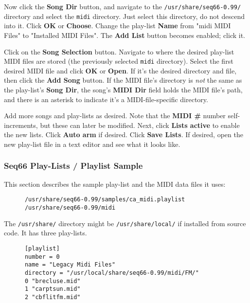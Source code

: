    Now click the \textbf{Song Dir} button,
   and navigate to the
   \texttt{/usr/share/seq66-0.99/} directory and select the
   \texttt{midi} directory.
   Just select this directory, do not descend into it.
   Click \textbf{OK} or \textbf{Choose}.
   Change the play-list \textbf{Name} from
   "midi MIDI Files" to "Installed MIDI Files".
   The \textbf{Add List} button becomes enabled; click it.
   
   Click on the \textbf{Song Selection} button.
   Navigate to where the desired play-list MIDI files are stored
   (the previously selected \texttt{midi} directory).
   Select the first desired MIDI file and click \textbf{OK} or
   \textbf{Open}.
   If it's the desired directory and file,
   then click the \textbf{Add Song} button.
   If the MIDI file's directory is \textsl{not} the same as the play-list's
   \textbf{Song Dir},
   the song's \textbf{MIDI Dir} field holds the MIDI file's
   path, and there is an asterisk to indicate it's a
   MIDI-file-specific directory.

   Add more songs and play-lists as desired.
   Note that the \textbf{MIDI \#} number self-increments, but
   these can later be modified.
   Next, click
   \textbf{Lists active} to enable the new lists.
   Click \textbf{Auto arm} if desired.
   Click \textbf{Save Lists}.
   If desired, open the new play-list file in a text editor
   and see what it looks like.


\subsubsection{Seq66 Play-Lists / Playlist Sample}
\label{subsubsec:playlist_playlist_sample}

   This section describes the sample play-list and the MIDI data
   files it uses:

   \begin{verbatim}
      /usr/share/seq66-0.99/samples/ca_midi.playlist
      /usr/share/seq66-0.99/midi
   \end{verbatim}

   The \texttt{/usr/share/} directory might be 
   \texttt{/usr/share/local/} if installed from source code.
   It has three play-lists.

   \begin{verbatim}
      [playlist]
      number = 0
      name = "Legacy Midi Files"
      directory = "/usr/local/share/seq66-0.99/midi/FM/"
      0 "brecluse.mid"
      1 "carptsun.mid"
      2 "cbflitfm.mid"
   \end{verbatim}

